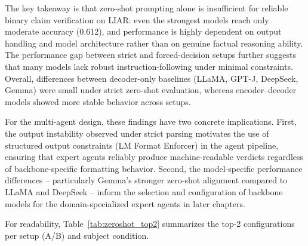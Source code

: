 The key takeaway is that zero-shot prompting alone is insufficient for reliable binary claim verification on LIAR: even the strongest models reach only moderate accuracy (0.612), and performance is highly dependent on output handling and model architecture rather than on genuine factual reasoning ability. The performance gap between strict and forced-decision setups further suggests that many models lack robust instruction-following under minimal constraints. Overall, differences between decoder-only baselines (LLaMA, GPT-J, DeepSeek, Gemma) were small under strict zero-shot evaluation, whereas encoder–decoder models showed more stable behavior across setups.

For the multi-agent design, these findings have two concrete implications. First, the output instability observed under strict 
parsing motivates the use of structured output constraints (LM Format Enforcer) in the agent pipeline, ensuring that expert 
agents reliably produce machine-readable verdicts regardless of backbone-specific formatting behavior. Second, the model-specific 
performance differences -- particularly Gemma's stronger zero-shot alignment compared to LLaMA and DeepSeek -- inform the selection 
and configuration of backbone models for the domain-specialized expert agents in later chapters.

For readability, Table~\ref{tab:zeroshot_top2} summarizes the top-2 configurations per setup (A/B) and subject condition.


